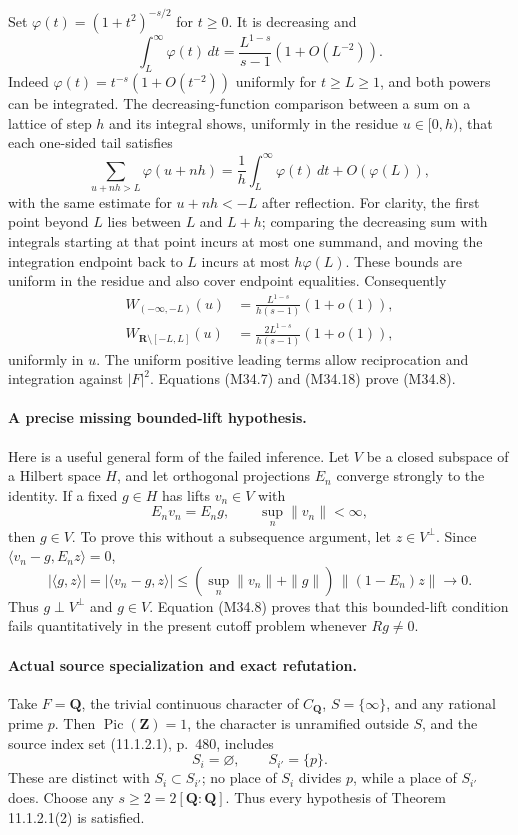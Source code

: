 Set $\varphi(t)=(1+t^2)^{-s/2}$ for $t\ge0$.
It is decreasing and
\[
 \int_L^\infty\varphi(t)\,dt
           =\frac{L^{1-s}}{s-1}(1+O(L^{-2})).
 \tag{M34.16}
\]
Indeed $\varphi(t)=t^{-s}(1+O(t^{-2}))$ uniformly for
$t\ge L\ge1$, and both powers can be integrated.
The decreasing-function comparison between a sum on a
lattice of step $h$ and its integral shows, uniformly in
the residue $u\in[0,h)$, that each one-sided tail satisfies
\[
 \sum_{u+nh>L}\varphi(u+nh)
   =\frac1h\int_L^\infty\varphi(t)\,dt+O(\varphi(L)),
 \tag{M34.17}
\]
with the same estimate for $u+nh<-L$ after reflection.
For clarity, the first point beyond $L$ lies between $L$
and $L+h$; comparing the decreasing sum with integrals
starting at that point incurs at most one summand, and
moving the integration endpoint back to $L$ incurs at
most $h\varphi(L)$.  These bounds are uniform in the
residue and also cover endpoint equalities.
Consequently
\[
 \begin{split}
 W_{(-\infty,-L)}(u)
    &=\frac{L^{1-s}}{h(s-1)}(1+o(1)),\\
 W_{\mathbf R\setminus[-L,L]}(u)
    &=\frac{2L^{1-s}}{h(s-1)}(1+o(1)),
 \end{split}
 \tag{M34.18}
\]
uniformly in $u$.  The uniform positive leading terms
allow reciprocation and integration against $|F|^2$.
Equations (M34.7) and (M34.18) prove (M34.8).

\paragraph{A precise missing bounded-lift hypothesis.}
Here is a useful general form of the failed inference.
Let $V$ be a closed subspace of a Hilbert space $H$, and
let orthogonal projections $E_n$ converge strongly to the
identity.  If a fixed $g\in H$ has lifts $v_n\in V$ with
\[
                 E_nv_n=E_ng,\qquad
                            \sup_n\|v_n\|<\infty,
 \tag{M34.19}
\]
then $g\in V$.  To prove this without a subsequence
argument, let $z\in V^\perp$.  Since
$\langle v_n-g,E_nz\rangle=0$,
\[
 |\langle g,z\rangle|
  =|\langle v_n-g,z\rangle|
  \le(\sup_n\|v_n\|+\|g\|)\,\|(1-E_n)z\|
          \longrightarrow0.
 \tag{M34.20}
\]
Thus $g\perp V^\perp$ and $g\in V$.  Equation (M34.8)
proves that this bounded-lift condition fails quantitatively
in the present cutoff problem whenever $Rg\ne0$.

\paragraph{Actual source specialization and exact refutation.}
Take $F=\mathbf Q$, the trivial continuous character of
$C_{\mathbf Q}$, $S=\{\infty\}$, and any rational prime
$p$.  Then $\operatorname{Pic}(\mathbf Z)=1$, the character
is unramified outside $S$, and the source index set
(11.1.2.1), p.~480, includes
\[
                         S_i=\varnothing,
                         \qquad S_{i'}=\{p\}.
 \tag{M34.21}
\]
These are distinct with $S_i\subset S_{i'}$; no place
of $S_i$ divides $p$, while a place of $S_{i'}$ does.
Choose any $s\ge2=2[\mathbf Q:\mathbf Q]$.
Thus every hypothesis of Theorem 11.1.2.1(2) is satisfied.

